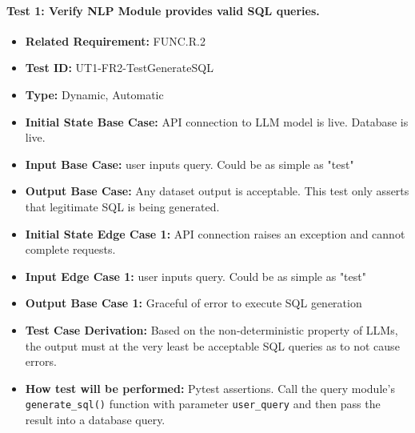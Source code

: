 \documentclass[12pt, titlepage]{article}
\begin{document}
\begin{flushleft}
\paragraph{Test 1: Verify NLP Module provides valid SQL queries.}
\begin{itemize}
    \item \textbf{Related Requirement:} FUNC.R.2
    \item \textbf{Test ID:} UT1-FR2-TestGenerateSQL
    \item \textbf{Type:} Dynamic, Automatic
    \item \textbf{Initial State Base Case:} API connection to LLM model is live. Database is live.
    \item \textbf{Input Base Case:} user inputs query. Could be as simple as "test"
    \item \textbf{Output Base Case:} Any dataset output is acceptable. This test only asserts that legitimate SQL is being generated.
    \item \textbf{Initial State Edge Case 1:} API connection raises an exception and cannot complete requests.
    \item \textbf{Input Edge Case 1:} user inputs query. Could be as simple as "test"
    \item \textbf{Output Base Case 1:} Graceful of error to execute SQL generation
    \item \textbf{Test Case Derivation:} Based on the non-deterministic property of LLMs, the output must at the very least be acceptable SQL queries as to not cause errors.
    \item \textbf{How test will be performed:} Pytest assertions. Call the query module's \texttt{generate\_sql()} function with parameter \texttt{user\_query} and then pass the result into a database query.
\end{itemize}


\end{flushleft}
\end{document}
